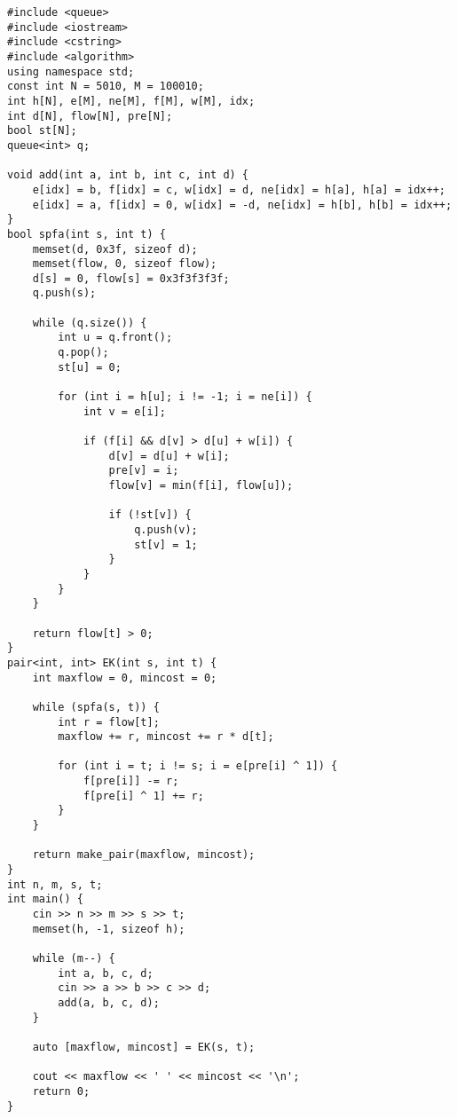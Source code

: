 \begin{verbatim}
#include <queue>
#include <iostream>
#include <cstring>
#include <algorithm>
using namespace std;
const int N = 5010, M = 100010;
int h[N], e[M], ne[M], f[M], w[M], idx;
int d[N], flow[N], pre[N];
bool st[N];
queue<int> q;

void add(int a, int b, int c, int d) {
    e[idx] = b, f[idx] = c, w[idx] = d, ne[idx] = h[a], h[a] = idx++;
    e[idx] = a, f[idx] = 0, w[idx] = -d, ne[idx] = h[b], h[b] = idx++;
}
bool spfa(int s, int t) {
    memset(d, 0x3f, sizeof d);
    memset(flow, 0, sizeof flow);
    d[s] = 0, flow[s] = 0x3f3f3f3f;
    q.push(s);

    while (q.size()) {
        int u = q.front();
        q.pop();
        st[u] = 0;

        for (int i = h[u]; i != -1; i = ne[i]) {
            int v = e[i];

            if (f[i] && d[v] > d[u] + w[i]) {
                d[v] = d[u] + w[i];
                pre[v] = i;
                flow[v] = min(f[i], flow[u]);

                if (!st[v]) {
                    q.push(v);
                    st[v] = 1;
                }
            }
        }
    }

    return flow[t] > 0;
}
pair<int, int> EK(int s, int t) {
    int maxflow = 0, mincost = 0;

    while (spfa(s, t)) {
        int r = flow[t];
        maxflow += r, mincost += r * d[t];

        for (int i = t; i != s; i = e[pre[i] ^ 1]) {
            f[pre[i]] -= r;
            f[pre[i] ^ 1] += r;
        }
    }

    return make_pair(maxflow, mincost);
}
int n, m, s, t;
int main() {
    cin >> n >> m >> s >> t;
    memset(h, -1, sizeof h);

    while (m--) {
        int a, b, c, d;
        cin >> a >> b >> c >> d;
        add(a, b, c, d);
    }

    auto [maxflow, mincost] = EK(s, t);

    cout << maxflow << ' ' << mincost << '\n';
    return 0;
}
\end{verbatim}